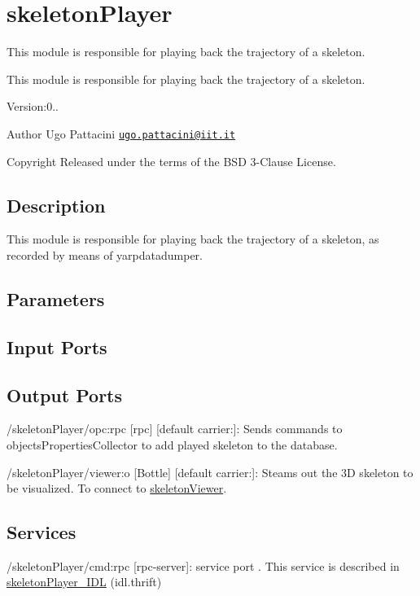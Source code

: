 \section{skeleton\+Player}
\label{group__skeletonPlayer}


This module is responsible for playing back the trajectory of a skeleton.  


This module is responsible for playing back the trajectory of a skeleton. 

Version\+:0.. \begin{DoxyAuthor}{Author}
Ugo Pattacini \href{mailto:ugo.pattacini@iit.it}{\tt ugo.\+pattacini@iit.\+it} ~\newline
 
\end{DoxyAuthor}
\begin{DoxyCopyright}{Copyright}
Released under the terms of the B\+SD 3-\/\+Clause License. 
\end{DoxyCopyright}
\hypertarget{group__skeletonViewer_intro_sec}{}\subsection{Description}\label{group__skeletonViewer_intro_sec}
This module is responsible for playing back the trajectory of a skeleton, as recorded by means of yarpdatadumper.\hypertarget{group__skeletonViewer_parameters_sec}{}\subsection{Parameters}\label{group__skeletonViewer_parameters_sec}
\hypertarget{group__skeletonViewer_inputports_sec}{}\subsection{Input Ports}\label{group__skeletonViewer_inputports_sec}
\hypertarget{group__skeletonViewer_outputports_sec}{}\subsection{Output Ports}\label{group__skeletonViewer_outputports_sec}

\begin{DoxyItemize}
\item /skeleton\+Player/opc\+:rpc \mbox{[}rpc\mbox{]} \mbox{[}default carrier\+:\mbox{]}\+: Sends commands to objects\+Properties\+Collector to add played skeleton to the database.
\item /skeleton\+Player/viewer\+:o \mbox{[}Bottle\mbox{]} \mbox{[}default carrier\+:\mbox{]}\+: Steams out the 3D skeleton to be visualized. To connect to \hyperlink{group__skeletonViewer}{skeleton\+Viewer}.
\end{DoxyItemize}\hypertarget{group__skeletonViewer_services_sec}{}\subsection{Services}\label{group__skeletonViewer_services_sec}

\begin{DoxyItemize}
\item /skeleton\+Player/cmd\+:rpc \mbox{[}rpc-\/server\mbox{]}\+: service port . This service is described in \hyperlink{classskeletonPlayer__IDL}{skeleton\+Player\+\_\+\+I\+DL} (idl.\+thrift) 
\end{DoxyItemize}